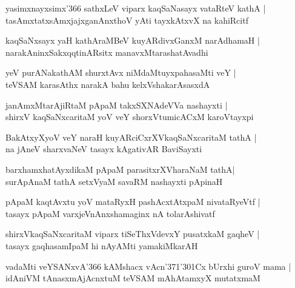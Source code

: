 \begin{shloka}
yasimxnayxsimx\char'366 sathxLeV viparx kaqSaNasayx vataRteV kathA |\\
tasAmxtatxsAmxjajxganAnxthoV yAti tayxkAtxvX na kahiRcitf
\end{shloka}

\begin{shloka}
kaqSaNxsayx yaH kathAraMBeV kuyARdivxGanxM narAdhamaH |\\
narakAninxSakxqqtinARsitx manavxMtarashatAvadhi
\end{shloka}

\begin{shloka}
yeV purANakathAM shurxtAvx niMdaMtuyxpahasaMti veY |\\
teVSAM karasAthx narakA bahu kelxVshakarAsasxdA 
\end{shloka}

\begin{shloka}
janAmxMtarAjiRtaM pApaM takxSXNAdeVVa nashayxti |\\
shirxV kaqSaNxcaritaM yoV veY shorxVtumicACxM karoVtayxpi
\end{shloka}

\begin{shloka}
BakAtxyXyoV veY naraH kuyARciCxrXVkaqSaNxcaritaM tathA |\\
na jAneV sharxvaNeV tasayx kAgativAR BaviSayxti
\end{shloka}

\begin{shloka}
barxhamxhatAyxdikaM pApaM parasitxrXVharaNaM tathA|\\
surApAnaM tathA setxVyaM savaRM nashayxti pApinaH 
\end{shloka}

\begin{shloka}
pApaM kaqtAvxtu yoV mataRyxH pashAcxtAtxpaM nivataRyeVtf |\\
tasayx pApaM varxjeVnAnxshamaginx nA tolarAshivatf
\end{shloka}

\begin{shloka}
shirxVkaqSaNxcaritaM viparx tiSeThxVdevxY pusatxkaM gaqheV |\\
tasayx gaqhasamIpaM hi nAyAMti yamakiMkarAH 
\end{shloka}

\begin{shloka}
vadaMti veYSANxvA\char'366 kAMshacx vAcn\char'371\char'301Cx bUrxhi guroV mama |\\
idAniVM tAnasxmAjAcnxtuM teVSAM mAhAtamxyX mutatxmaM 
\end{shloka}

